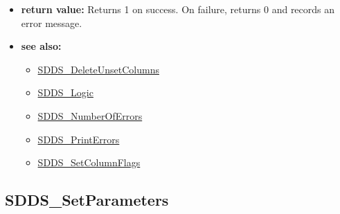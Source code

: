 \documentclass[11pt]{article}
\newcommand{\progref}[1]{\hyperref{SDDS_#1}{{\tt SDDS\_#1} (}{)}{SDDS_#1}}
\begin{document}
\begin{itemize}
\begin{itemize}
\begin{itemize}
\item SDDS\_MATCH\_STRING - SDDS\_SetColumnsOfInterest(SDDS\_TABLE *SDDS\_table, SDDS\_MATCH\_STRING, char *string, long logic\_mode), where string is a wildcard-containing, NULL-terminated character string to which column names will be matched. The columns so matched are added to the list of columns deemed to be ``of interest'' by the caller. The order in which the caller gives the column names is recorded, and calls to SDDS\_GetRow and SDDS\_GetMatrixOfRows return the columns in this order. See the manual page for SDDS\_Logic for a discussion of the logic\_mode parameter. 
\end{itemize}
\end{itemize}
\item {\bf return value:}\newline
Returns 1 on success. On failure, returns 0 and records an error message.
\item {\bf see also:}
\begin{itemize}
\item \progref{DeleteUnsetColumns}
\item \progref{Logic}
\item \progref{NumberOfErrors}
\item \progref{PrintErrors}
\item \progref{SetColumnFlags}
\end{itemize}
\end{itemize}

\subsection{SDDS\_SetParameters}
\label{SDDS_SetParameters}
\end{document}
